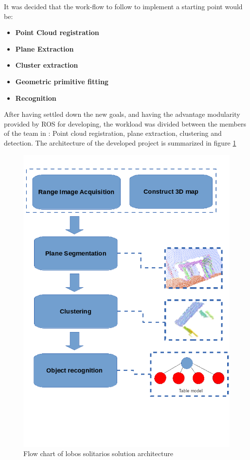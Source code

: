 \documentclass[fontsize=12pt]{article}
\begin{document}
It was decided that the work-flow to follow to implement a starting point would be:
\begin{itemize}
\item \textbf{Point Cloud registration}
\item\textbf{Plane Extraction}
\item \textbf{Cluster extraction}
\item \textbf{Geometric primitive fitting}
\item \textbf{Recognition}
\end{itemize}
After having settled down the new goals, and having the advantage modularity provided by ROS for developing, the workload was divided between the members of the team in : Point cloud registration, plane extraction,  clustering and detection.  
The architecture of the developed project is summarized in figure \ref{fig:flowchart}
  \begin{figure}[H]
\begin{center}
\includegraphics[width=0.7\linewidth]{images/flow_chart}
\caption{Flow chart of lobos solitarios solution architecture}
\label{fig:flowchart}
\end{center}
\end{figure}
\end{document}
